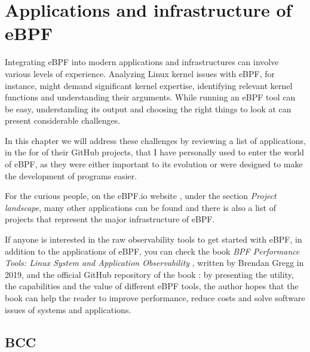 \chapter{Applications and infrastructure of eBPF}

Integrating eBPF into modern applications and infrastructures can involve various levels of experience. 
Analyzing Linux kernel issues with eBPF, for instance, might demand significant kernel expertise, identifying relevant kernel functions and understanding their arguments.
While running an eBPF tool can be easy, understanding its output and choosing the right things to look at can present considerable challenges.

In this chapter we will address these challenges by reviewing a list of applications, in the for of their GitHub projects, that I have personally used to enter the world of eBPF, as they were either important to its evolution or were designed to make the development of programs easier.

For the curious people, on the eBPF.io website \cite{eBPFioWebsite}, under the section \textit{Project landscape}, many other applications can be found and there is also a list of projects that represent the major infrastructure of eBPF.

If anyone is interested in the raw observability tools to get started with eBPF, in addition to the applications of eBPF, you can check the book \textit{BPF Performance Tools: Linux System and Application Observability} \cite{BPFToolsBookWebsite}, written by Brendan Gregg in 2019, and the official GitHub repository of the book \cite{BPFToolsBookGitHubRepo}: by presenting the utility, the capabilities and the value of different eBPF tools, the author hopes that the book can help the reader to improve performance, reduce costs and solve software issues of systems and applications.


%
%
%

\section{BCC}


